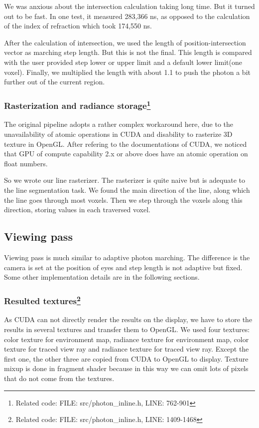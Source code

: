\documentclass[a4paper]{article}
\begin{document}
\begin{CJK*}{UTF8}{gkai}
We was anxious about the intersection calculation taking long time. But it turned out to be fast. In one test, it measured 283,366 ns, as opposed to the calculation of the index of refraction which took 174,550 ns.

After the calculation of intersection, we used the length of position-intersection vector as marching step length. But this is not the final. This length is compared with the user provided step lower or upper limit and a default lower limit(one voxel). Finally, we multiplied the length with about 1.1 to push the photon a bit further out of the current region.


\subsubsection[Rasterization and radiance storage]{Rasterization and radiance storage\footnote{Related code: FILE: src/photon\_inline.h, LINE: 762-901}}
The original pipeline adopts a rather complex workaround here, due to the unavailability of atomic operations in CUDA and disability to rasterize 3D texture in OpenGL. After refering to the documentations of CUDA, we noticed that GPU of compute capability 2.x or above does have an atomic operation on float numbers.

So we wrote our line rasterizer. The rasterizer is quite naive but is adequate to the line segmentation task. We found the main direction of the line, along which the line goes through most voxels. Then we step through the voxels along this direction, storing values in each traversed voxel.



\subsection{Viewing pass}
Viewing pass is much similar to adaptive photon marching. The difference is the camera is set at the position of eyes and step length is not adaptive but fixed. Some other implementation details are in the following sections.

\subsubsection[Resulted textures]{Resulted textures\footnote{Related code: FILE: src/photon\_inline.h, LINE: 1409-1468}}
As CUDA can not directly render the results on the display, we have to store the results in several textures and transfer them to OpenGL. We used four textures: color texture for environment map, radiance texture for environment map, color texture for traced view ray and radiance texture for traced view ray. Except the first one, the other three are copied from CUDA to OpenGL to display. Texture mixup is done in fragment shader because in this way we can omit lots of pixels that do not come from the textures.


\end{CJK*}
\end{document}
